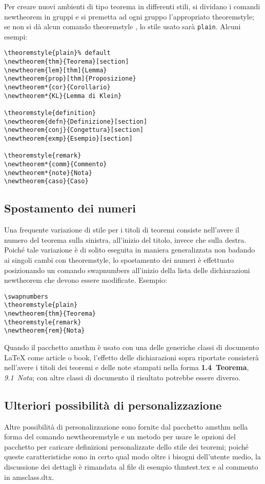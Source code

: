 \documentclass[a4paper]{article}
\newcommand{\ntt}{%
  \fontfamily\ttdefault \fontseries\mddefault \fontshape\updefault
  \selectfont
}
\DeclareRobustCommand{\cn}[1]{{\ntt\bslchar#1}}
\DeclareRobustCommand{\cls}[1]{{\ntt#1}}
\DeclareRobustCommand{\pkg}[1]{{\ntt#1}}
\DeclareRobustCommand{\fn}[1]{{\ntt#1}}
\def\latex/{{\protect\LaTeX}}
\begin{document}
Per creare nuovi ambienti di tipo teorema in differenti stili,
si dividano i comandi \cn{new\-theorem} in gruppi e si premetta ad ogni
gruppo l'appropriato \cn{theo\-rem\-style}; se non si d\`a alcun comando \cn{theoremstyle}
, lo stile usato sar\`a \texttt{plain}. Alcuni esempi:
\begin{verbatim}
\theoremstyle{plain}% default
\newtheorem{thm}{Teorema}[section]
\newtheorem{lem}[thm]{Lemma}
\newtheorem{prop}[thm]{Proposizione}
\newtheorem*{cor}{Corollario}
\newtheorem*{KL}{Lemma di Klein}

\theoremstyle{definition}
\newtheorem{defn}{Definizione}[section]
\newtheorem{conj}{Congettura}[section]
\newtheorem{exmp}{Esempio}[section]

\theoremstyle{remark}
\newtheorem*{comm}{Commento}
\newtheorem*{note}{Nota}
\newtheorem{caso}{Caso}
\end{verbatim}

\subsection{Spostamento dei numeri}

Una frequente variazione di stile per i titoli di teoremi consiste
nell'avere il numero del teorema sulla sinistra, all'inizio del titolo,
invece che sulla destra. Poich\'e tale variazione \`e di solito eseguita
in maniera generalizzata non badando ai singoli cambi con \cn{theoremstyle},
lo spostamento dei numeri \`e effettuato posizionando un
comando\cn{swapnumbers} all'inizio della lista delle dichiarazioni
\cn{newtheorem} che devono essere modificate. Esempio:
\begin{verbatim}
\swapnumbers
\theoremstyle{plain}
\newtheorem{thm}{Teorema}
\theoremstyle{remark}
\newtheorem{rem}{Nota}
\end{verbatim}
Quando il pacchetto \pkg{amsthm} \`e usato con una delle generiche
classi di documento \latex/
come \cls{article} o \cls{book}, l'effetto delle dichiarazioni sopra
riportate consister\`a nell'avere i titoli dei teoremi e delle note
stampati nella forma \textbf{1.4~Teorema}, \textit{9.1~Nota}; con altre
classi di documento il risultato potrebbe essere diverso.

\subsection{Ulteriori possibilit\`a di personalizzazione}

Altre possibilit\`a di personalizzazione sono fornite dal pacchetto
\pkg{amsthm} nella forma del comando \cn{newtheoremstyle} e un metodo
per usare le opzioni del pacchetto per caricare definizioni
personalizzate dello stile dei teoremi; poich\'e queste caratteristiche
sono in certo qual modo oltre i bisogni dell'utente medio, la
discussione dei dettagli \`e rimandata al file di esempio
\fn{thmtest.tex} e al commento in \fn{amsclass.dtx}.
\end{document}
